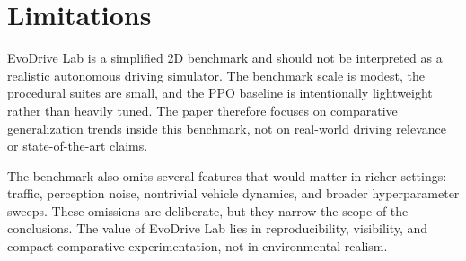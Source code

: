 \section{Limitations}

EvoDrive Lab is a simplified 2D benchmark and should not be interpreted as a realistic autonomous driving simulator. The benchmark scale is modest, the procedural suites are small, and the PPO baseline is intentionally lightweight rather than heavily tuned. The paper therefore focuses on comparative generalization trends inside this benchmark, not on real-world driving relevance or state-of-the-art claims.

The benchmark also omits several features that would matter in richer settings: traffic, perception noise, nontrivial vehicle dynamics, and broader hyperparameter sweeps. These omissions are deliberate, but they narrow the scope of the conclusions. The value of EvoDrive Lab lies in reproducibility, visibility, and compact comparative experimentation, not in environmental realism.
